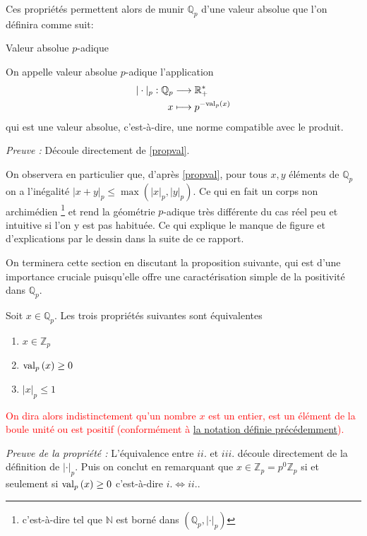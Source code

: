 Ces propriétés permettent alors de munir $\mathbb{Q}_{p} $ d'une valeur absolue que l'on définira comme suit:

\begin{definition} Valeur absolue $p$-adique
\label{vabs}

	On appelle valeur absolue $p$-adique l'application 
\begin{align*}
|\cdot|_p : \mathbb{Q}_{p} & \longrightarrow \mathbb{R}^*_+\\
x & \longmapsto p^{-\text{val}_p\left(x\right)} 
\end{align*}
qui est une valeur absolue, c'est-à-dire, une norme compatible avec le produit.
\end{definition}

\textit{Preuve :} Découle directement de \ref{propval}.

On observera en particulier que, d'après \ref{propval}, pour tous $x,y$ éléments de $\mathbb{Q}_{p}$ on a l'inégalité $\left|x+y\right|_p \le \max\left( \left| x \right|_p,\left| y \right|_p \right)$. Ce qui en fait un corps non archimédien \footnote{c'est-à-dire tel que $\mathbb{N}$ est borné dans $\left( \mathbb{Q}_{p}, \left| \cdot \right|_p \right) $} et rend la géométrie $p$-adique très différente du cas réel peu et intuitive si l'on y est pas habituée. Ce qui explique le manque de figure et d'explications par le dessin dans la suite de ce rapport.

On terminera cette section en discutant la proposition suivante, qui est d'une importance cruciale puisqu'elle offre une caractérisation simple de la positivité dans $\mathbb{Q}_{p}$.

\begin{proposition}
	Soit $x \in \mathbb{Q}_{p} $. Les trois propriétés suivantes sont équivalentes 
	\begin{enumerate}[label= \textit{\roman*}.]
		\item $x \in \mathbb{Z}_p$
		\item $\text{val}_p\left(x\right)\ge 0$
		\item $\left| x \right|_p\le 1$
	\end{enumerate}
\end{proposition}

\textcolor{red}{ On dira alors indistinctement qu'un nombre $x$ est un entier, est un élément de la boule unité ou est positif (conformément à \hyperlink{positif}{la notation définie précédemment}).}

\textit{ Preuve de la propriété : } L'équivalence entre $ii$. et $iii$. découle directement de la définition de $\left| \cdot  \right|_p$. Puis on conclut en remarquant que $x \in \mathbb{Z}_p = p^0 \mathbb{Z}_p$ si et seulement si $\text{val}_p\left(x\right)\ge 0$ c'est-à-dire $i. \iff ii.$.
